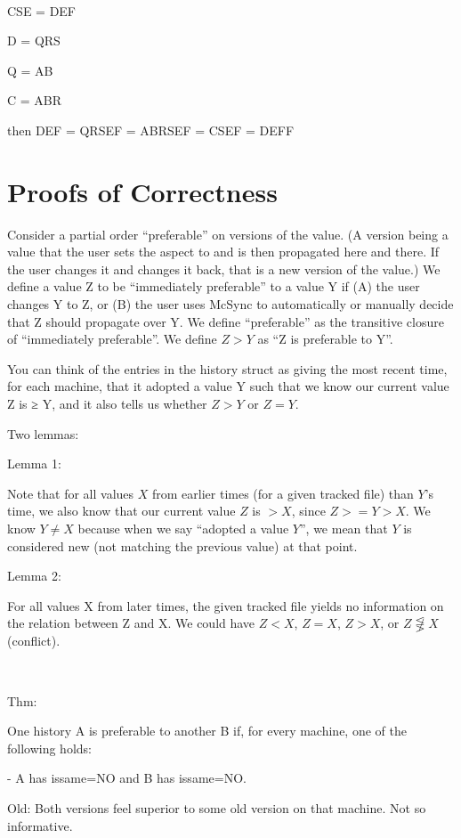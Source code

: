 \documentclass{book}
\begin{document}
~

CSE = DEF

D = QRS

Q = AB

C = ABR

then DEF = QRSEF = ABRSEF = CSEF = DEFF





\section{Proofs of Correctness}




Consider a partial order ``preferable'' on versions of the value.  (A version being a value that the user sets the aspect to and is then propagated here and there.  If the user changes it and changes it back, that is a new version of the value.)  We define a value Z to be ``immediately preferable'' to a value Y if (A) the user changes Y to Z, or (B) the user uses McSync to automatically or manually decide that Z should propagate over Y.  We define ``preferable'' as the transitive closure of ``immediately preferable''.  We define $Z > Y$ as ``Z is preferable to Y''.

You can think of the entries in the history struct as giving the most recent time, for each machine, that it adopted a value Y such that we know our current value Z is ≥ Y, and it also tells us whether $Z > Y$ or $Z = Y$.

Two lemmas:

Lemma 1:

Note that for all values $X$ from earlier times (for a given tracked file) than $Y$'s time, we also know that our current value $Z$ is $> X$, since $Z >= Y > X$.  We know $Y ≠ X$ because when we say ``adopted a value $Y$'', we mean that $Y$ is considered new (not matching the previous value) at that point.

Lemma 2:

For all values X from later times, the given tracked file yields no information on the relation between Z and X.  We could have $Z < X$, $Z = X$, $Z > X$, or $Z \not\lesseqgtr X$ (conflict).

~

Thm:

One history A is preferable to another B if, for every machine, one of the following holds:

	- A has issame=NO and B has issame=NO.

	    Old: Both versions feel superior to some old version on that machine.  Not so informative.
\end{document}
